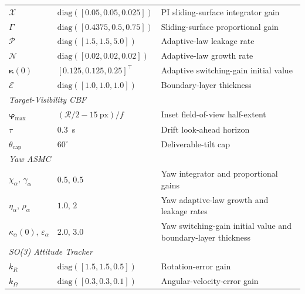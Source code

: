 \documentclass{IEEEtaes}
\begin{document}
\begin{table}[!t]
\begin{tabular}{p{} p{} p{}}
        $\mathcal{X}$           & $\text{diag}([0.05,0.05,0.025])$ & PI sliding-surface integrator gain \\
        $\Gamma$                & $\text{diag}([0.4375,0.5,0.75])$ & Sliding-surface proportional gain \\
        $\mathcal{P}$           & $\text{diag}([1.5,1.5,5.0])$ & Adaptive-law leakage rate \\
        $\mathcal{N}$           & $\text{diag}([0.02,0.02,0.02])$ & Adaptive-law growth rate \\
        $\boldsymbol{\kappa}(0)$ & $[0.125,0.125,0.25]^\top$ & Adaptive switching-gain initial value \\
        $\mathcal{E}$           & $\text{diag}([1.0,1.0,1.0])$ & Boundary-layer thickness \\
    \midrule
        \multicolumn{3}{l}{\textit{Target-Visibility CBF}} \\
        $\boldsymbol{\varphi}_\text{max}$ & $(\mathcal{R}/2-15~\text{px})/f$ & Inset field-of-view half-extent \\
        $\tau$                      & $0.3$~s & Drift look-ahead horizon \\
        $\theta_\text{cap}$         & $60^\circ$ & Deliverable-tilt cap \\
    \midrule
        \multicolumn{3}{l}{\textit{Yaw ASMC}} \\
        $\chi_\alpha,\,\gamma_\alpha$       & $0.5,\,0.5$ & Yaw integrator and proportional gains \\
        $\eta_\alpha,\,\rho_\alpha$         & $1.0,\,2$ & Yaw adaptive-law growth and leakage rates \\
        $\kappa_{\alpha}(0),\,\varepsilon_\alpha$ & $2.0,\,3.0$ & Yaw switching-gain initial value and boundary-layer thickness \\
    \midrule
        \multicolumn{3}{l}{\textit{SO(3) Attitude Tracker}} \\
        $k_R$      & $\text{diag}([1.5,1.5,0.5])$ & Rotation-error gain \\
        $k_\Omega$ & $\text{diag}([0.3,0.3,0.1])$ & Angular-velocity-error gain \\
    \bottomrule
    \end{tabular}
\end{table}
\end{document}

